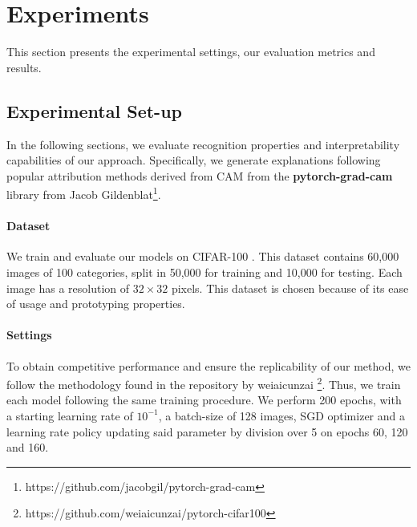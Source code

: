 \section{Experiments}
This section presents the experimental settings, our evaluation metrics and results.

\subsection{Experimental Set-up}
In the following sections, we evaluate recognition properties and interpretability capabilities of 
our approach. Specifically, we generate explanations following popular attribution methods derived 
from CAM \autocite{zhou2016learning} from the \textbf{pytorch-grad-cam} library from Jacob 
Gildenblat\footnote{https://github.com/jacobgil/pytorch-grad-cam}.

\paragraph{Dataset}
We train and evaluate our models on CIFAR-100 \autocite{krizhevsky2009learning}. This dataset 
contains 60,000 images of 100 categories, split in 50,000 for training and 10,000 for testing. Each 
image has a resolution of $32\times32$ pixels. This dataset is chosen because of its ease of usage 
and prototyping properties. 

\paragraph{Settings}
To obtain competitive performance and ensure the replicability of our method, we follow the 
methodology found in the repository by weiaicunzai 
\footnote{https://github.com/weiaicunzai/pytorch-cifar100}. Thus, we train each model following the 
same training procedure. We perform 200 epochs, with a starting learning rate of $10^{-1}$, a 
batch-size of 128 images, SGD optimizer and a learning rate policy updating said parameter by 
division over 5 on epochs 60, 120 and 160.  
